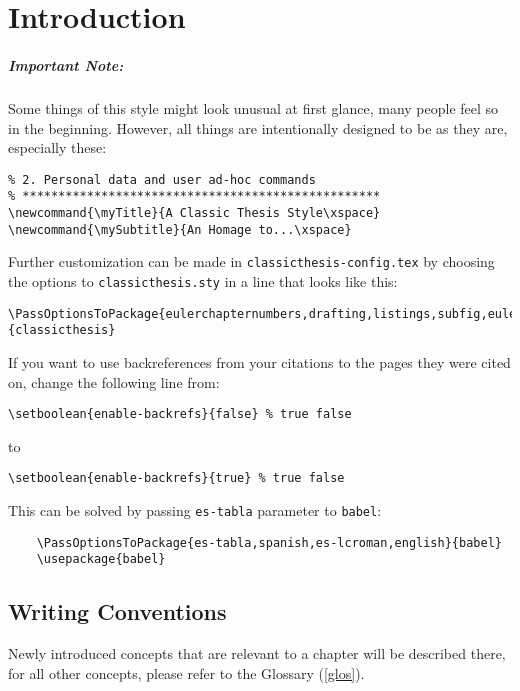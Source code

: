 \chapter{Introduction}\label{ch:introduction}

\paragraph{Important Note:} Some things of this style might look
unusual at first glance, many people feel so in the beginning.
However, all things are intentionally designed to be as they are,
especially these:


\begin{lstlisting}[frame=lt]
% **************************************************
% 2. Personal data and user ad-hoc commands
% **************************************************
\newcommand{\myTitle}{A Classic Thesis Style\xspace} 
\newcommand{\mySubtitle}{An Homage to...\xspace} 
\end{lstlisting}

Further customization can be made in \texttt{classicthesis-config.tex}
by choosing the options to \texttt{classicthesis.sty} in a line that looks like this:

\begin{lstlisting}[frame=lt]
\PassOptionsToPackage{eulerchapternumbers,drafting,listings,subfig,eulermath,parts}{classicthesis}
\end{lstlisting}

If you want to use backreferences from your citations to the pages
they were cited on, change the following line from:
\begin{lstlisting}[breaklines=false,frame=lt]
\setboolean{enable-backrefs}{false} % true false
\end{lstlisting}
to
\begin{lstlisting}[breaklines=false,frame=lt]
\setboolean{enable-backrefs}{true} % true false
\end{lstlisting}

This can be solved by passing \texttt{es-tabla} parameter to \texttt{babel}:
\begin{verbatim}
	\PassOptionsToPackage{es-tabla,spanish,es-lcroman,english}{babel}
	\usepackage{babel}
\end{verbatim}

\section{Writing Conventions}
Newly introduced concepts that are relevant to a chapter will be described there, for all other concepts, please refer to the Glossary (\autoref{glos}).










   

